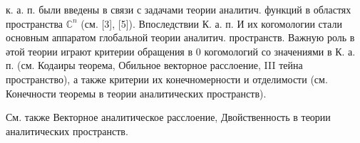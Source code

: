 \documentclass[10pt]{article}
\begin{document}
к. а. п. были введены в связи с задачами теории аналитич. функций в областях пространства $\mathbb{C}^{n}$ (см. [3], [5]). Впоследствии К. а. п. И их когомологии стали основным аппаратом глобальной теории аналитич. пространств. Важную роль в әтой теории играют критерии обращения в 0 когомологий со значениями в К. а. п. (см. Кодаиры теорема, Обильное векторное расслоение, III тейна пространство), а также критерии их конечномерности и отделимости (см. Конечности теоремы в теории аналитических пространств).



См. также Векторное аналитическое расслоение, Двойственность в теории аналитических пространств.
\end{document}
